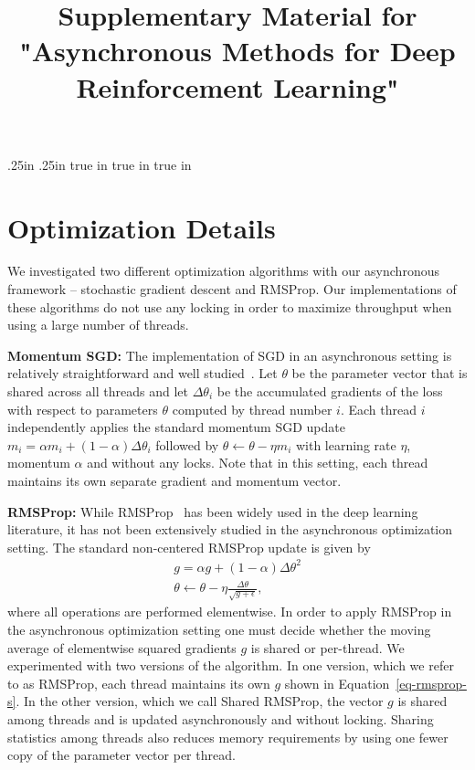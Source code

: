 \documentclass{article} \usepackage{times}
\begin{document}
\clearpage

\renewcommand{\thealgorithm}{S\arabic{algorithm}}
\renewcommand{\thefigure}{S\arabic{figure}}
\renewcommand{\theequation}{S\arabic{equation}}
\renewcommand{\thetable}{S\arabic{table}}

\oddsidemargin .25in    \evensidemargin .25in
 true in
\topmargin -0.5in
\addtolength{\headsep}{0.25in}
 true in        true in        \onecolumn
\title{Supplementary Material for "Asynchronous Methods for Deep Reinforcement Learning"}
\maketitle
\thispagestyle{empty}

\label{supplementary}

\section{Optimization Details}
\label{sec:opt}
We investigated two different optimization algorithms with our asynchronous framework -- stochastic gradient descent and RMSProp.  Our implementations of these algorithms do not use any locking in order to maximize throughput when using a large number of threads.

\textbf{Momentum SGD:}
The implementation of SGD in an asynchronous setting is relatively straightforward and well studied~\citep{recht2011hogwild}.
Let $\theta$ be the parameter vector that is shared across all threads and let $\Delta\theta_i$ be the accumulated gradients of the loss with respect to parameters $\theta$ computed by thread number $i$.
Each thread $i$ independently applies the standard momentum SGD update $m_i = \alpha m_i + (1-\alpha) \Delta\theta_i$ followed by $\theta \gets \theta - \eta m_i$ with learning rate $\eta$, momentum $\alpha$ and without any locks.
Note that in this setting, each thread maintains its own separate gradient and momentum vector.

\textbf{RMSProp:} While RMSProp~\citep{tieleman2012lecture} has been widely used in the deep learning literature, it has not been extensively studied in the asynchronous optimization setting.  The standard non-centered RMSProp update is given by
\begin{eqnarray}
    \label{eq-rmsprop-s}
    g = \alpha g + (1-\alpha)\Delta\theta^2 \\
    \theta \gets \theta - \eta \frac{\Delta\theta}{\sqrt{g+\epsilon}},
\end{eqnarray}
where all operations are performed elementwise.
In order to apply RMSProp in the asynchronous optimization setting one must decide whether the moving average of elementwise squared gradients $g$ is shared or per-thread.
We experimented with two versions of the algorithm.
In one version, which we refer to as RMSProp, each thread maintains its own $g$ shown in Equation~\ref{eq-rmsprop-s}.
In the other version, which we call Shared RMSProp, the vector $g$ is shared among threads and is updated asynchronously and without locking.
Sharing statistics among threads also reduces memory requirements by using one fewer copy of the parameter vector per thread.
\end{document}
